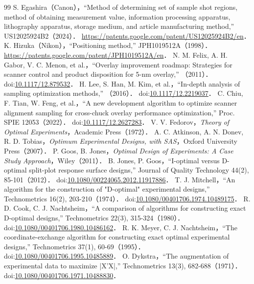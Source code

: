 \begin{thebibliography}{99}
 S. Egashira（Canon），``Method of determining set of sample shot regions, method of obtaining measurement value, information processing apparatus, lithography apparatus, storage medium, and article manufacturing method,'' US12025924B2（2024）． \url{https://patents.google.com/patent/US12025924B2/en}．
 K. Hizuka（Nikon），``Positioning method,'' JPH1019512A（1998）． \url{https://patents.google.com/patent/JPH1019512A/en}．
 N. M. Felix, A. H. Gabor, V. C. Menon, et al.，``Overlay improvement roadmap: Strategies for scanner control and product disposition for 5-nm overlay,'' （2011）． doi:\href{https://doi.org/10.1117/12.879532}{10.1117/12.879532}．
 H. Lee, S. Han, M. Kim, et al.，``In-depth analysis of sampling optimization methods,'' （2016）． doi:\href{https://doi.org/10.1117/12.2219037}{10.1117/12.2219037}．
 C. Chiu, F. Tian, W. Feng, et al.，``A new development algorithm to optimize scanner alignment sampling for cross-chuck overlay performance optimization,'' Proc. SPIE 12053（2022）． doi:\href{https://doi.org/10.1117/12.2627283}{10.1117/12.2627283}．
 V. V. Fedorov，\textit{Theory of Optimal Experiments}，Academic Press（1972）．
 A. C. Atkinson, A. N. Donev, R. D. Tobias，\textit{Optimum Experimental Designs, with SAS}，Oxford University Press（2007）．
 P. Goos, B. Jones，\textit{Optimal Design of Experiments: A Case Study Approach}，Wiley（2011）．
 B. Jones, P. Goos，``I-optimal versus D-optimal split-plot response surface designs,'' Journal of Quality Technology 44(2), 85-101（2012）． doi:\href{https://doi.org/10.1080/00224065.2012.11917886}{10.1080/00224065.2012.11917886}．
 T. J. Mitchell，``An algorithm for the construction of "D-optimal" experimental designs,'' Technometrics 16(2), 203-210（1974）． doi:\href{https://doi.org/10.1080/00401706.1974.10489175}{10.1080/00401706.1974.10489175}．
 R. D. Cook, C. J. Nachtsheim，``A comparison of algorithms for constructing exact D-optimal designs,'' Technometrics 22(3), 315-324（1980）． doi:\href{https://doi.org/10.1080/00401706.1980.10486162}{10.1080/00401706.1980.10486162}．
 R. K. Meyer, C. J. Nachtsheim，``The coordinate-exchange algorithm for constructing exact optimal experimental designs,'' Technometrics 37(1), 60-69（1995）． doi:\href{https://doi.org/10.1080/00401706.1995.10485889}{10.1080/00401706.1995.10485889}．
 O. Dykstra，``The augmentation of experimental data to maximize |X'X|,'' Technometrics 13(3), 682-688（1971）． doi:\href{https://doi.org/10.1080/00401706.1971.10488830}{10.1080/00401706.1971.10488830}．

\end{thebibliography}
